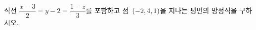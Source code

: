 직선 $\dfrac{x-3}{2}=y-2=\dfrac{1-z}{3}$를 포함하고 점~$(-2{,}\mkern3mu\mathopen{}4{,}\mkern3mu\mathopen{}1)$을 지나는 평면의 방정식을 구하시오.
